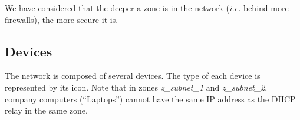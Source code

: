 \documentclass[a4paper, 12pt]{article}
\begin{document}
	We have considered that the deeper a zone is in the network (\emph{i.e.} behind more firewalls), the more secure it is.
	
	\subsection{Devices}
	
	The network is composed of several devices. The type of each device is represented by its icon. Note that in zones \emph{z\_subnet\_1} and \emph{z\_subnet\_2}, company computers (\enquote{Laptops}) cannot have the same IP address as the DHCP relay in the same zone.
\end{document}
